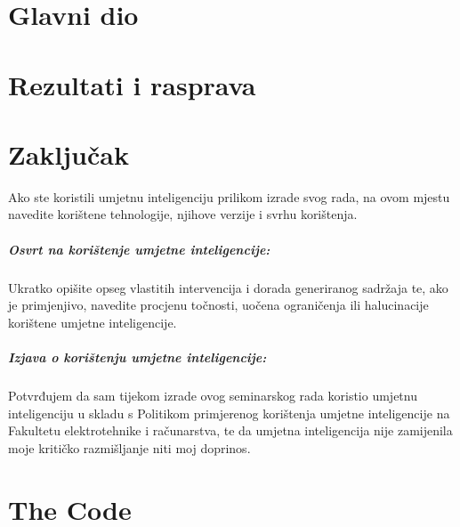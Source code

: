 \documentclass[seminarskirad]{fer}
\begin{document}
\chapter{Glavni dio}
\label{pog:glavni_dio}

\Blindtext


\chapter{Rezultati i rasprava}
\label{pog:rezultati_i_rasprava}

\Blindtext


\chapter{Zaključak}
\label{pog:zakljucak}

\blindtext







\begin{izjavaoui}

  Ako ste koristili umjetnu inteligenciju prilikom izrade svog rada,
  na ovom mjestu navedite korištene tehnologije, njihove verzije i svrhu korištenja.

  \paragraph{Osvrt na korištenje umjetne inteligencije:}
  Ukratko opišite opseg vlastitih intervencija i dorada generiranog sadržaja te, ako je primjenjivo,
  navedite procjenu točnosti, uočena ograničenja ili halucinacije korištene umjetne inteligencije.

  \paragraph{Izjava o korištenju umjetne inteligencije:}
  Potvrđujem da sam tijekom izrade ovog seminarskog rada koristio umjetnu inteligenciju u skladu s
  Politikom primjerenog korištenja umjetne inteligencije na Fakultetu elektrotehnike i računarstva,
  te da umjetna inteligencija nije zamijenila moje kritičko razmišljanje niti moj doprinos.

\end{izjavaoui}



\backmatter

\chapter{The Code}

\Blindtext
\end{document}
